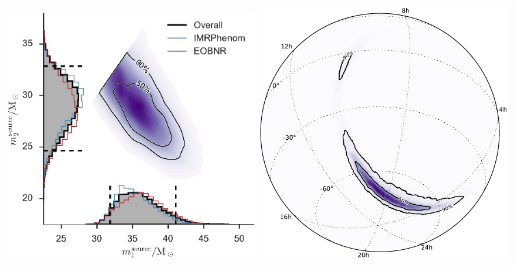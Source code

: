 \documentclass[aspectratio=169]{beamer}
\begin{document}
\begin{frame}
\begin{columns}
        \includegraphics[width=0.49\textwidth]{figures/ligo_m1_m2.pdf}
        \includegraphics[width=0.49\textwidth]{figures/ligo_lambert-skymap.pdf}
    \end{columns}
\end{frame}
\end{document}
